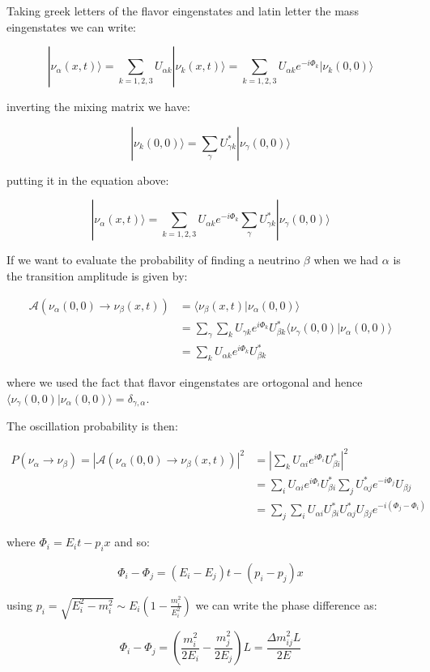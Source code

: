 \documentclass[
  letterpaper,
  DIV=11,
  numbers=noendperiod]{scrreprt}
\begin{document}
Taking greek letters of the flavor eingenstates and latin letter the
mass eingenstates we can write:

\[|\nu_\alpha(x,t)\rangle = \sum_{k=1,2,3} U_{\alpha k} |\nu_k (x,t)\rangle = \sum_{k=1,2,3} U_{\alpha k} e^{-i\Phi_k}|\nu_k (0,0)\rangle\]

inverting the mixing matrix we have:

\[|\nu_k (0,0)\rangle =\sum_\gamma U^*_{\gamma  k} |\nu_\gamma(0,0)\rangle\]

putting it in the equation above:

\[|\nu_\alpha(x,t)\rangle =\sum_{k=1,2,3} U_{\alpha k} e^{-i\Phi_k}\sum_\gamma U^*_{\gamma  k} |\nu_\gamma(0,0)\rangle\]

If we want to evaluate the probability of finding a neutrino \(\beta\)
when we had \(\alpha\) is the transition amplitude is given by:

\[\begin{aligned}
\mathcal{A}(\nu_\alpha(0,0)\rightarrow \nu_\beta(x,t)) &= \langle \nu_\beta(x,t)|\nu_\alpha(0,0)\rangle \\
&= \sum_\gamma \sum_k U_{\gamma k}e^{i\Phi_k}U^*_{\beta k}\langle \nu_\gamma(0,0)|\nu_\alpha(0,0)\rangle \\
&= \sum_k U_{\alpha  k}e^{i\Phi_k}U^*_{\beta k}
\end{aligned}\]

where we used the fact that flavor eingenstates are ortogonal and hence
\(\langle \nu_\gamma(0,0)|\nu_\alpha(0,0)\rangle = \delta_{\gamma,\alpha}\).

The oscillation probability is then:

\[\begin{aligned}
P(\nu_\alpha \rightarrow \nu_\beta) = |\mathcal{A}(\nu_\alpha(0,0)\rightarrow \nu_\beta(x,t))|^2 &= \left|\sum_k U_{\alpha i}e^{i\Phi_i}U^*_{\beta i}\right|^2\\
&=\sum_i U_{\alpha i}e^{i\Phi_i}U^*_{\beta i}\sum_j U^*_{\alpha j}e^{-i\Phi_j}U_{\beta j}\\
&=\sum_j\sum_i U_{\alpha i}U^*_{\beta i}U^*_{\alpha j}U_{\beta j}e^{-i(\Phi_j-\Phi_i)}
\end{aligned}\]

where \(\Phi_i = E_i t- p_i x\) and so:

\[\Phi_i - \Phi_j = (E_i - E_j)t - (p_i -p_j)x\]

using \(p_i = \sqrt{E^2_i -m_i^2}\sim E_i(1-\frac{m^2_i}{E_i^2})\) we
can write the phase difference as:

\[\Phi_i - \Phi_j = (\frac{m_i^2}{2E_i}-\frac{m_j^2}{2E_j})L = \frac{\Delta m_{ij}^2L}{2E}\]
\end{document}
